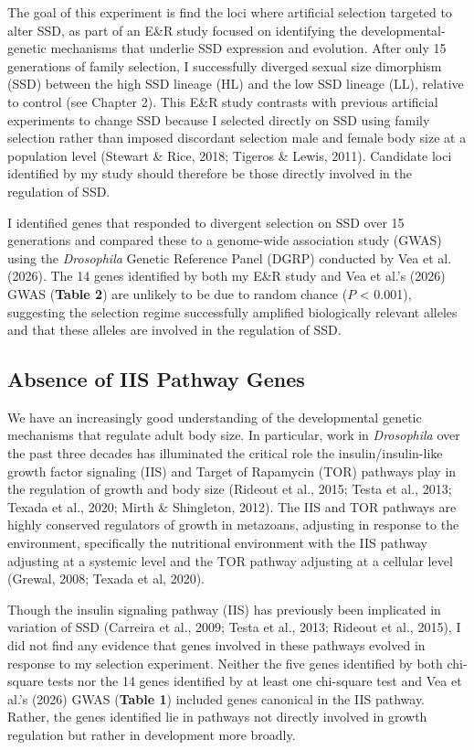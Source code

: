 \documentclass[12pt,reqno,oneside]{report}
\begin{document}
The goal of this experiment is find the loci where artificial selection targeted to alter SSD, as part of an E\&R study focused on identifying the developmental-genetic mechanisms that underlie SSD expression and evolution. After only 15 generations of family selection, I successfully diverged sexual size dimorphism (SSD) between the high SSD lineage (HL) and the low SSD lineage (LL), relative to control (see Chapter 2). This E\&R study contrasts with previous artificial experiments to change SSD because I selected directly on SSD using family selection rather than imposed discordant selection male and female body size at a population level (Stewart \& Rice, 2018; Tigeros \& Lewis, 2011). Candidate loci identified by my study should therefore be those directly involved in the regulation of SSD.

I identified genes that responded to divergent selection on SSD over 15 generations and compared these to a genome-wide association study (GWAS) using the \textit{Drosophila} Genetic Reference Panel (DGRP) conducted by Vea et al. (2026). The 14 genes identified by both my E\&R study and Vea et al.'s (2026) GWAS (\textbf{Table 2}) are unlikely to be due to random chance ($P$ < 0.001), suggesting the selection regime successfully amplified biologically relevant alleles and that these alleles are involved in the regulation of SSD.

\subsection{Absence of IIS Pathway Genes}

We have an increasingly good understanding of the developmental genetic mechanisms that regulate adult body size. In particular, work in \textit{Drosophila} over the past three decades has illuminated the critical role the insulin/insulin-like growth factor signaling (IIS) and Target of Rapamycin (TOR) pathways play in the regulation of growth and body size (Rideout et al., 2015; Testa et al., 2013; Texada et al., 2020;  Mirth \& Shingleton, 2012). The IIS and TOR pathways are highly conserved regulators of growth in metazoans, adjusting in response to the environment, specifically the nutritional environment with the IIS pathway adjusting at a systemic level and the TOR pathway adjusting at a cellular level (Grewal, 2008; Texada et al, 2020).

Though the insulin signaling pathway (IIS) has previously been implicated in variation of SSD (Carreira et al., 2009; Testa et al., 2013; Rideout et al., 2015), I did not find any evidence that genes involved in these pathways evolved in response to my selection experiment. Neither the five genes identified by both chi-square tests nor the 14 genes identified by at least one chi-square test and Vea et al.'s (2026) GWAS (\textbf{Table 1}) included genes canonical in the IIS pathway. Rather, the genes identified lie in pathways not directly involved in growth regulation but rather in development more broadly.
\end{document}
